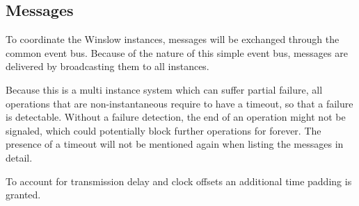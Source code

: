 




\subsection{Messages}

To coordinate the Winslow instances, messages will be exchanged through the common event bus.
Because of the nature of this simple event bus, messages are delivered by broadcasting them to all instances.


Because this is a multi instance system which can suffer partial failure, all operations that are non-instantaneous require to have a timeout, so that a failure is detectable.
Without a failure detection, the end of an operation might not be signaled, which could potentially block further operations for forever.
The presence of a timeout will not be mentioned again when listing the messages in detail.

To account for transmission delay and clock offsets an additional time padding is granted. 



